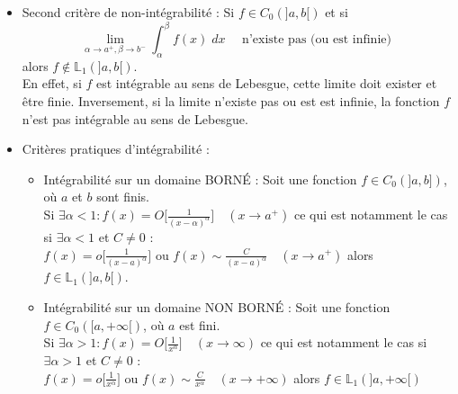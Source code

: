 \documentclass[a4paper]{article}
\begin{document}
\begin{itemize}
\item Second critère de non-intégrabilité : Si $ f \in C_0(]a, b[) $ et si 
\[ \lim_{\alpha \to a^+, \beta \to b^-} \int_\alpha^\beta f(x) \; d x \quad \text{ n'existe pas (ou est infinie) } \]
alors $ f \notin \mathbb{L}_1(]a, b[) $. \\
En effet, si $ f $ est intégrable au sens de Lebesgue, cette limite doit exister et être finie. Inversement, si la limite n'existe pas ou est est infinie, la fonction $ f $ n'est pas intégrable au sens de Lebesgue.






\item Critères pratiques d'intégrabilité : 
\begin{itemize}
    \item Intégrabilité sur un domaine BORNÉ : Soit une fonction $ f \in C_0(]a, b]) $, où $ a $ et $ b $ sont finis. \\
Si $\displaystyle \exists \alpha < 1 : f(x) = O \bigg[ \frac{1}{(x - \alpha)^\alpha} \bigg] \quad (x \to a^+) $ ce qui est notamment le cas si $ \exists \alpha < 1 $ et $ C \neq 0 $ : \\
$\displaystyle f(x) = o \bigg[ \frac{1}{(x - a)^\alpha} \bigg] $ ou  $\displaystyle f(x) \sim \frac{C}{(x - a)^\alpha} \quad (x \to a^+) $ alors $ f \in \mathbb{L}_1 (]a, b[) $.
    \item Intégrabilité sur un domaine NON BORNÉ : Soit une fonction $ f \in C_0 ([a, + \infty [) $, où $ a $ est fini. \\
Si $\displaystyle \exists \alpha > 1 : f(x) = O \bigg[ \frac{1}{x^\alpha} \bigg] \quad (x \to \infty) $ ce qui est notamment le cas si 
$ \exists \alpha > 1 $ et $ C \neq 0 $ : \\
$\displaystyle f(x) = o \bigg[ \frac{1}{x^\alpha} \bigg] $ ou $\displaystyle f(x) \sim \frac{C}{x^\alpha} \quad (x \to + \infty) $ alors 
$ f \in \mathbb{L}_1 (]a, + \infty[) $
\end{itemize}







\end{itemize}
\end{document}
